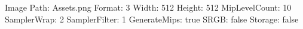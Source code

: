 Image Path: Assets\Textures\scarychar.png
Format: 3
Width: 512
Height: 512
MipLevelCount: 10
SamplerWrap: 2
SamplerFilter: 1
GenerateMips: true
SRGB: false
Storage: false